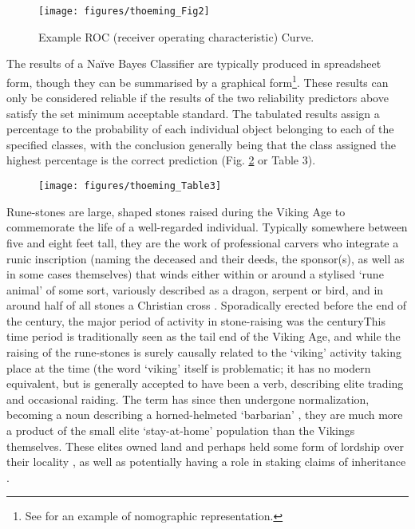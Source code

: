 	\begin{figure}[!htb]
		\texttt{[image: figures/thoeming\_Fig2]}
		\centering
		\caption{Example ROC (receiver operating characteristic) Curve.}
		\label{fig:Fig2}
	\end{figure}
	The results of a Naïve Bayes Classifier are typically produced in spreadsheet form, though they can be summarised by a graphical form\footnote{See \textcite[490]{Gansell_2006} for an example of nomographic representation.}. These results can only be considered reliable if the results of the two reliability predictors above satisfy the set minimum acceptable standard. The tabulated results assign a percentage to the probability of each individual object belonging to each of the specified classes, with the conclusion generally being that the class assigned the highest percentage is the correct prediction (Fig. \ref{fig:Table3} or Table 3).
	
	\begin{figure}[!htb]
		\texttt{[image: figures/thoeming\_Table3]}
		\centering
		\label{fig:Table3}
	\end{figure}
Rune-stones are large, shaped stones raised during the Viking Age to commemorate the life of a well-regarded individual. Typically somewhere between five and eight feet tall, they are the work of professional carvers who integrate a runic inscription (naming the deceased and their deeds, the sponsor(s), as well as in some cases themselves) that winds either within or around a stylised ‘rune animal’ of some sort, variously described as a dragon, serpent or bird, and in around half of all stones a Christian cross \parencite[10]{Sawyer_2000}. Sporadically erected before the end of the  century\AD, the major period of activity in stone-raising was the  century\AD This time period is traditionally seen as the tail end of the Viking Age, and while the raising of the rune-stones is surely causally related to the ‘viking’ activity taking place at the time (the word ‘viking’ itself is problematic; it has no modern equivalent, but is generally accepted to have been a verb, describing elite trading and occasional raiding. The term has since then undergone normalization, becoming a noun describing a horned-helmeted ‘barbarian’ \parencite[56]{Jesch_2001}, they are much more a product of the small elite ‘stay-at-home’ population than the Vikings themselves. These elites owned land and perhaps held some form of lordship over their locality \parencite[36--41]{Jesch_2001}, as well as potentially having a role in staking claims of inheritance \parencite[74--91]{Sawyer_2000}.

